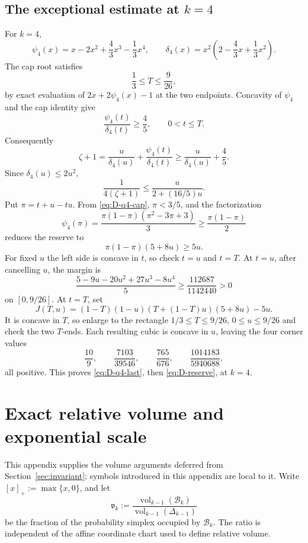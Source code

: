 \documentclass[11pt]{article}
\theoremstyle{definition}
\theoremstyle{remark}
\newcommand{\body}{\mathcal{B}}
\begin{document}
\subsection{The exceptional estimate at \texorpdfstring{$k=4$}{k = 4}}

For $k=4$,
\[
 \psi_4(x)=x-2x^2+\frac43x^3-\frac13x^4,\qquad
 \delta_4(x)=x^2\left(2-\frac43x+\frac13x^2\right).
\]
The cap root satisfies
\begin{equation}\label{eq:D-q4-cap}
 \frac13\le T\le\frac9{26},
\end{equation}
by exact evaluation of $2x+2\psi_4(x)-1$ at the two endpoints.  Concavity
of $\psi_4$ and the cap identity give
\begin{equation}\label{eq:D-q4-ratio}
 \frac{\psi_4(t)}{\delta_4(t)}\ge\frac45,\qquad0<t\le T.
\end{equation}
Consequently
\[
 \zeta+1=\frac{u}{\delta_4(u)}+
       \frac{\psi_4(t)}{\delta_4(t)}
 \ge\frac{u}{\delta_4(u)}+\frac45.
\]
Since $\delta_4(u)\le2u^2$,
\begin{equation}\label{eq:D-q4-stationary}
 \frac1{4(\zeta+1)}
 \le\frac{u}{2+(16/5)u}.
\end{equation}
Put $\pi=t+u-tu$.  From \eqref{eq:D-q4-cap}, $\pi<3/5$, and the
factorization
\[
 \psi_4(\pi)=\frac{\pi(1-\pi)(\pi^2-3\pi+3)}3
 \ge\frac{\pi(1-\pi)}2
\]
reduces the reserve to
\begin{equation}\label{eq:D-q4-last}
 \pi(1-\pi)(5+8u)\ge5u.
\end{equation}
For fixed $u$ the left side is concave in $t$, so check $t=u$ and $t=T$.
At $t=u$, after cancelling $u$, the margin is
\[
 \frac{5-9u-20u^2+27u^3-8u^4}{5}
 \ge\frac{112687}{1142440}>0
\]
on $[0,9/26]$.  At $t=T$, set
\[
 J(T,u)=(1-T)(1-u)(T+(1-T)u)(5+8u)-5u.
\]
It is concave in $T$, so enlarge to the rectangle
$1/3\le T\le9/26$, $0\le u\le9/26$ and check the two $T$-ends.
Each resulting cubic is concave in $u$, leaving the four corner values
\[
 \frac{10}{9},\qquad\frac{7103}{39546},\qquad
 \frac{765}{676},\qquad\frac{1014183}{5940688},
\]
all positive.  This proves \eqref{eq:D-q4-last}, then
\eqref{eq:D-reserve}, at $k=4$.

\section{Exact relative volume and exponential scale}
\label{app:exact-volume}

This appendix supplies the volume arguments deferred from
Section~\ref{sec:invariant}; symbols introduced in this appendix are local
to it.
Write $[x]_+:=\max\{x,0\}$, and let
\[
 \mathfrak v_k:=
 \frac{\operatorname{vol}_{k-1}(\body_k)}
      {\operatorname{vol}_{k-1}(\Delta_{k-1})}
\]
be the fraction of the probability simplex occupied by $\body_k$.  The
ratio is independent of the affine coordinate chart used to define relative
volume.
\end{document}
